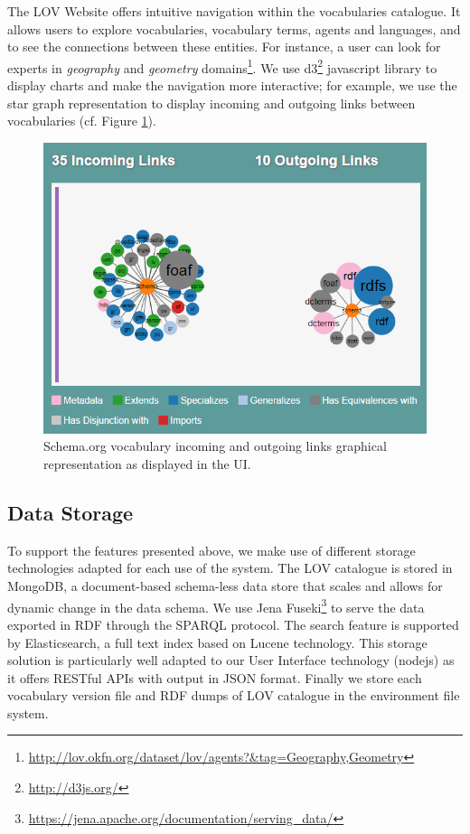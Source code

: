 \documentclass{iosart2c}
\begin{document}
The LOV Website offers intuitive navigation within the vocabularies catalogue. It allows users to explore vocabularies, vocabulary terms, agents and languages, and to see the connections between these entities. For instance, a user can look for experts in \emph{geography} and \emph{geometry} domains\footnote{\url{http://lov.okfn.org/dataset/lov/agents?&tag=Geography,Geometry}}. We use d3\footnote{\url{http://d3js.org/}} javascript library to display charts and make the navigation more interactive; for example, we use the star graph representation to display incoming and outgoing links between vocabularies (cf. Figure \ref{fig:graphVocab}). 


\begin{figure}[ht!b]
\includegraphics[scale=0.45]{graphVocab.png}
\caption{Schema.org vocabulary incoming and outgoing links graphical representation as displayed in the UI.}
\label{fig:graphVocab}
\end{figure}

\subsection{Data Storage}

To support the features presented above, we make use of different storage technologies adapted for each use of the system. The LOV catalogue is stored in MongoDB\textregistered, a document-based schema-less data store that scales and allows for dynamic change in the data schema. We use Jena Fuseki\footnote{\url{https://jena.apache.org/documentation/serving_data/}} to serve the data exported in RDF through the SPARQL protocol. The search feature is supported by Elasticsearch\textregistered, a full text index based on Lucene technology. This storage solution is particularly well adapted to our User Interface technology (nodejs) as it offers RESTful APIs with output in JSON format. Finally we store each vocabulary version file and RDF dumps of LOV catalogue in the environment file system.
\end{document}
